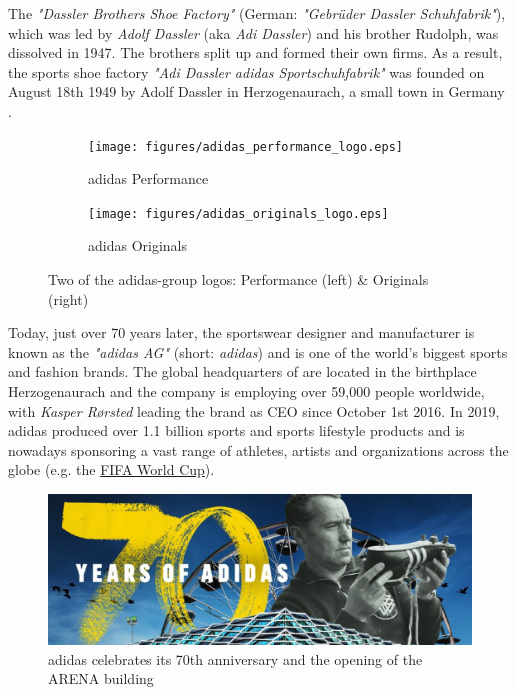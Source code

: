 

The \textit{"Dassler Brothers Shoe Factory"} (German: \textit{"Gebrüder Dassler Schuhfabrik"}), which was led by \textit{Adolf Dassler} (aka \textit{Adi Dassler}) and his brother Rudolph, was dissolved in 1947. The brothers split up and formed their own firms. As a result, the sports shoe factory \textit{"Adi Dassler adidas Sportschuhfabrik"} was founded on August 18th 1949 by Adolf Dassler in Herzogenaurach, a small town in Germany \citep{adidas-group}. \\

\begin{figure}[H]
\centering
\begin{subfigure}{.4\textwidth}
  \centering
  \texttt{[image: figures/adidas\_performance\_logo.eps]}
  \caption{adidas Performance}
  \label{fig:adidas_performance_logo}
\end{subfigure}
\begin{subfigure}{.4\textwidth}
  \centering
  \texttt{[image: figures/adidas\_originals\_logo.eps]}
  \caption{adidas Originals}
  \label{fig:adidas_originals_logo}
\end{subfigure}
\caption{Two of the adidas-group logos: Performance (left) \& Originals (right) \\ \citep{adidasmediacenter}}
\label{fig:adidas_logos}
\end{figure} 


Today, just over 70 years later, the sportswear designer and manufacturer is known as the \textit{"adidas AG"} (short: \textit{adidas}) and is one of the world's biggest sports and fashion brands. The global headquarters of are located in the birthplace Herzogenaurach and the company is employing over 59,000 people worldwide, with \textit{Kasper R\o rsted} leading the brand as CEO since October 1st 2016. In 2019, adidas produced over 1.1 billion sports and sports lifestyle products \citep{adidas-group-profile} and is nowadays sponsoring a vast range of athletes, artists and organizations across the globe (e.g. the  \href{https://www.fifa.com/worldcup/}{FIFA World Cup\texttrademark}).\\

\begin{figure}[H]
\centering
  \includegraphics[width=.95\linewidth]{figures/adidas_70_years.eps}
  \caption{adidas celebrates its 70th anniversary and the opening of the ARENA building \citep{adidas70years}}
  \label{fig:adidas_70_years}
\end{figure}


